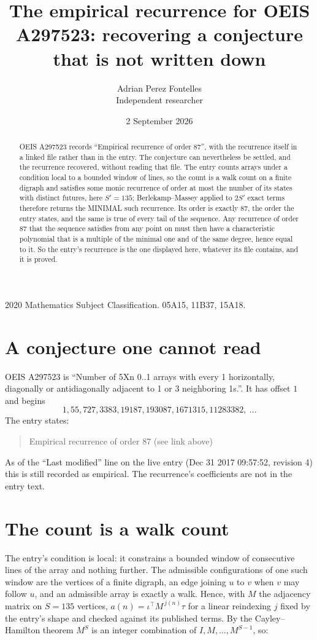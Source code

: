 \documentclass[11pt,a4paper]{article}
\title{The empirical recurrence for OEIS A297523: recovering a conjecture that is not written down}
\author{Adrian Perez Fontelles\\ \small Independent researcher}
\date{2 September 2026}
\theoremstyle{plain}
\theoremstyle{definition}
\begin{document}
\maketitle

\begin{abstract}
OEIS A297523 records ``Empirical recurrence of order $87$'', with the recurrence itself in a
linked file rather than in the entry. The conjecture can nevertheless be settled, and the
recurrence recovered, without reading that file. The entry counts arrays under a condition
local to a bounded window of lines, so the count is a walk count on a finite digraph and
satisfies some monic recurrence of order at most the number of its states with distinct
futures, here $S'=135$; Berlekamp--Massey applied to $2S'$ exact
terms therefore returns the MINIMAL such recurrence. Its order is exactly $87$, the order
the entry states, and the same is true of every tail of the sequence. Any recurrence of order
$87$ that the sequence satisfies from any point on must then have a characteristic
polynomial that is a multiple of the minimal one and of the same degree, hence equal to it. So
the entry's recurrence is the one displayed here, whatever its file contains, and it is
proved.
\end{abstract}

\noindent\small 2020 Mathematics Subject Classification. 05A15, 11B37, 15A18.\normalsize

\section{A conjecture one cannot read}

OEIS A297523 is ``Number of 5Xn 0..1 arrays with every 1 horizontally, diagonally or antidiagonally adjacent to 1 or 3 neighboring 1s.''. It has offset $1$ and begins
\[
1, 55, 727, 3383, 19187, 193087, 1671315, 11283382,\ \dots
\]
The entry states:
\begin{quote}
Empirical recurrence of order 87 (see link above)
\end{quote}
As of the ``Last modified'' line on the live entry (Dec 31 2017 09:57:52, revision 4) this is still
recorded as empirical. The recurrence's coefficients are not in the entry text.

\section{The count is a walk count}

The entry's condition is local: it constrains a bounded window of consecutive lines of the
array and nothing further. The admissible configurations of one such window are the vertices
of a finite digraph, an edge joining $u$ to $v$ when $v$ may follow $u$, and an admissible
array is exactly a walk. Hence, with $M$ the adjacency matrix on $S=135$ vertices,
$a(n)=\iota^{\!\top}M^{\,j(n)}\tau$ for a linear reindexing $j$ fixed by the entry's shape
and checked against its published terms. By the Cayley--Hamilton theorem $M^{S}$ is an
integer combination of $I,M,\dots,M^{S-1}$, so:
\end{document}

